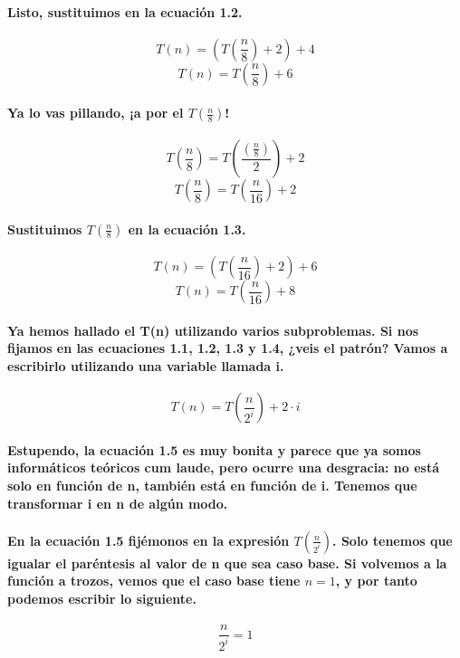 \documentclass{book}
\begin{document}
	\paragraph{Listo, sustituimos en la ecuación 1.2.}
	\begin{equation}
		T(n) = (T(\frac{n}{8}) + 2) + 4 \nonumber  
	\end{equation}
	\begin{equation}
		T(n) = T(\frac{n}{8}) + 6 
	\end{equation}
	\paragraph{Ya lo vas pillando, ¡a por el $T(\frac{n}{8})$!}
	\begin{equation}
		T(\frac{n}{8}) = T(\frac{(\frac{n}{8})}{2}) + 2 \nonumber 
	\end{equation}
	\begin{equation}
		T(\frac{n}{8}) = T(\frac{n}{16}) + 2 \nonumber 
	\end{equation}	
	\paragraph{Sustituimos $T(\frac{n}{8})$ en la ecuación 1.3.}
	\begin{equation}
		T(n) = (T(\frac{n}{16}) + 2) + 6 \nonumber  
	\end{equation}	
	\begin{equation}
		T(n) = T(\frac{n}{16}) + 8 
	\end{equation}	
	\paragraph{Ya hemos hallado el T(n) utilizando varios subproblemas. Si nos fijamos en las ecuaciones 1.1, 1.2, 1.3 y 1.4, ¿veis el patrón? Vamos a escribirlo utilizando una variable llamada i.}
	\begin{equation}
		T(n) = T(\frac{n}{2^i}) + 2 \cdot i 
	\end{equation}
	\paragraph{Estupendo, la ecuación 1.5 es muy bonita y parece que ya somos informáticos teóricos cum laude, pero ocurre una desgracia: no está solo en función de n, también está en función de i. Tenemos que transformar i en n de algún modo.}
	\paragraph{En la ecuación 1.5 fijémonos en la expresión $T(\frac{n}{2^i})$. Solo tenemos que igualar el paréntesis al valor de n que sea caso base. Si volvemos a la función a trozos, vemos que el caso base tiene $n=1$, y por tanto podemos escribir lo siguiente.}
	\begin{equation}
		\frac{n}{2^i} = 1 \nonumber 
	\end{equation}
\end{document}

